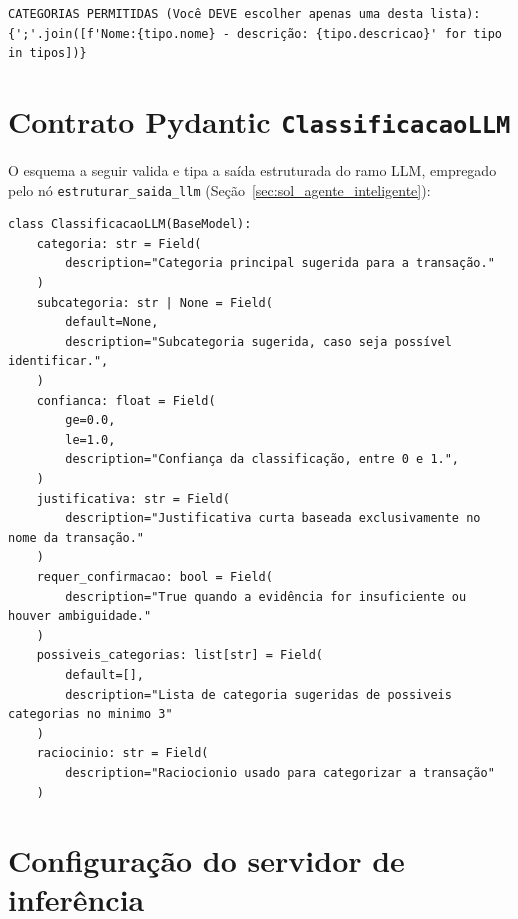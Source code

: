 \begin{apendicesenv}
{\begin{verbatim}
CATEGORIAS PERMITIDAS (Você DEVE escolher apenas uma desta lista):
{';'.join([f'Nome:{tipo.nome} - descrição: {tipo.descricao}' for tipo in tipos])}
\end{verbatim}
}

\section{Contrato Pydantic \texttt{ClassificacaoLLM}}

O esquema a seguir valida e tipa a saída estruturada do ramo LLM, empregado pelo nó \texttt{estruturar\_saida\_llm} (Seção~\ref{sec:sol_agente_inteligente}):

{\scriptsize
\begin{verbatim}
class ClassificacaoLLM(BaseModel):
    categoria: str = Field(
        description="Categoria principal sugerida para a transação."
    )
    subcategoria: str | None = Field(
        default=None,
        description="Subcategoria sugerida, caso seja possível identificar.",
    )
    confianca: float = Field(
        ge=0.0,
        le=1.0,
        description="Confiança da classificação, entre 0 e 1.",
    )
    justificativa: str = Field(
        description="Justificativa curta baseada exclusivamente no nome da transação."
    )
    requer_confirmacao: bool = Field(
        description="True quando a evidência for insuficiente ou houver ambiguidade."
    )
    possiveis_categorias: list[str] = Field(
        default=[],
        description="Lista de categoria sugeridas de possiveis categorias no minimo 3"
    )
    raciocinio: str = Field(
        description="Raciocionio usado para categorizar a transação"
    )
\end{verbatim}
}

\section{Configuração do servidor de inferência}
\label{sec:apendice_lmstudio}


\end{apendicesenv}
